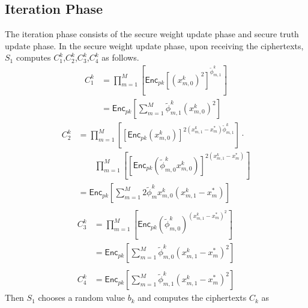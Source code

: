 \documentclass[conference]{IEEEtran}
\begin{document}
\subsection{Iteration Phase}
The iteration phase consists of the secure weight update phase and secure truth update phase.
In the secure weight update phase, 
upon receiving the ciphertexts, $S_1$ computes $C_1^k$,$C_2^k$,$C_3^k$,$C_4^k$ as follows.
\begin{equation}
  \begin{split}
  C_1^k & = \prod_{m=1}^M\left[ \mathsf{Enc}_{pk}{\left[\left(x_{m,0}^k\right)^2\right]}^{\tilde{\phi}_{m,1}^k} \right] \\
  & = \mathsf{Enc}_{pk}\left[ \sum_{m=1}^M \tilde{\phi}_{m,1}^k \left(x_{m,0}^k\right)^2\right]
  \end{split}
\end{equation}
\begin{equation}
  \begin{split}
  C_2^k & =  \prod_{m=1}^M\left[ \left[\mathsf{Enc}_{pk}\left(x_{m,0}^k\right)\right]^{2\left(x_{m,1}^k - x_m^*\right)\tilde{\phi}_{m,1}^k}\right] \cdot \\
          & \qquad \prod_{m=1}^M\left[ \left[\mathsf{Enc}_{pk}\left(\tilde{\phi}_{m,0}^k x_{m,0}^k\right)\right]^{2\left(x_{m,1}^k - x_m^*\right)} \right] \\
          & = \mathsf{Enc}_{pk}\left[\sum_{m=1}^M 2\tilde{\phi}_m^k x_{m,0}^k\left(x_{m,1}^k - x_m^*\right)\right]  \\
  \end{split}
\end{equation}
\begin{equation}
  \begin{split}
    C_3^k & = \prod_{m=1}^M\left[ \mathsf{Enc}_{pk}\left(\tilde{\phi}_{m,0}^k\right)^{\left(x_{m,1}^k - x_m^*\right)^2} \right] \\
    & = \mathsf{Enc}_{pk}\left[\sum_{m=1}^M \tilde{\phi}_{m,0}^k\left(x_{m,1}^k - x_m^*\right)^2\right] \\
  \end{split}
\end{equation}
\begin{equation}
  \begin{split}
    C_4^k & = \mathsf{Enc}_{pk}\left[\sum_{m=1}^M \tilde{\phi}_{m,1}^k \left(x_{m,1}^k - x_m^*\right)^2\right]
  \end{split}
\end{equation}
Then $S_1$ chooses a random value $b_k$ and computes the ciphertexts $C_k$ as 
\end{document}
